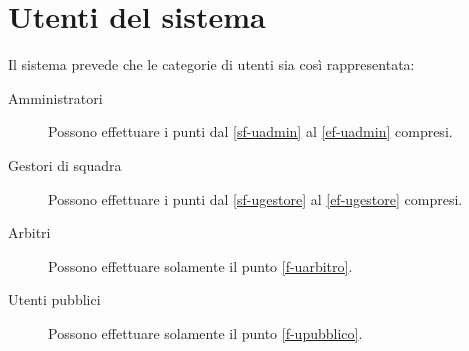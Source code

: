 \section{Utenti del sistema}
Il sistema prevede che le categorie di utenti sia così rappresentata:

\begin{description}
	
	\item[Amministratori] Possono effettuare i punti dal \ref{sf-uadmin} al \ref{ef-uadmin} compresi.
	
	\item[Gestori di squadra] Possono effettuare i punti dal \ref{sf-ugestore} al \ref{ef-ugestore} compresi.
	
	\item[Arbitri] Possono effettuare solamente il punto \ref{f-uarbitro}.
	
	\item[Utenti pubblici] Possono effettuare solamente il punto \ref{f-upubblico}.
	
\end{description}